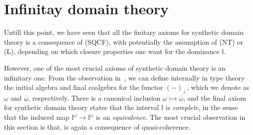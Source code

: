 \documentclass[12pt]{amsart}
\newtheorem{proposition}[theorem]{Proposition}
\theoremstyle{definition}
\newcommand{\mb}[1]{\mathbf{#1}}
\newcommand{\mbb}[1]{\mathbb{#1}}
\newcommand{\I}{\mbb I}
\newcommand{\alg}{\text{-}\mb{Alg}}
\newcommand{\ov}[1]{\overline{#1}}
\newcommand{\pair}[1]{\left\langle#1\right\rangle}
\newcommand{\ev}{\mathrm{ev}}
\newcommand{\inj}{\rightarrowtail}
\newcommand{\prt}{_{\bot}}
\newcommand{\spec}{\operatorname{Spec}}
\begin{document}



\section{Infinitay domain theory}

Untill this point, we have seen that all the finitary axioms for synthetic domain theory is a consequence of (SQCF), with potentially the assumption of (NT) or (L), depending on which closure properties one want for the dominance $\I$. 

However, one of the most crucial axioms of synthetic domain theory is an infinitary one. From the observation in~\cite{hyland2006first,JIBLADZE1997185}, we can define internally in type theory the initial algebra and final coalgebra for the functor $(-)\prt$, which we denote as $\omega$ and $\ov\omega$, respectively. There is a canonical inclusion $\omega \inj \ov\omega$, and the final axiom for synthetic domain theory states that the interval $\I$ is \emph{complete}, in the sense that the induced map $\I^{\ov\omega} \to \I^\omega$ is an \emph{equivalence}. The most crucial observation in this section is that, is again a consequence of quasi-coherence. 
\end{document}
